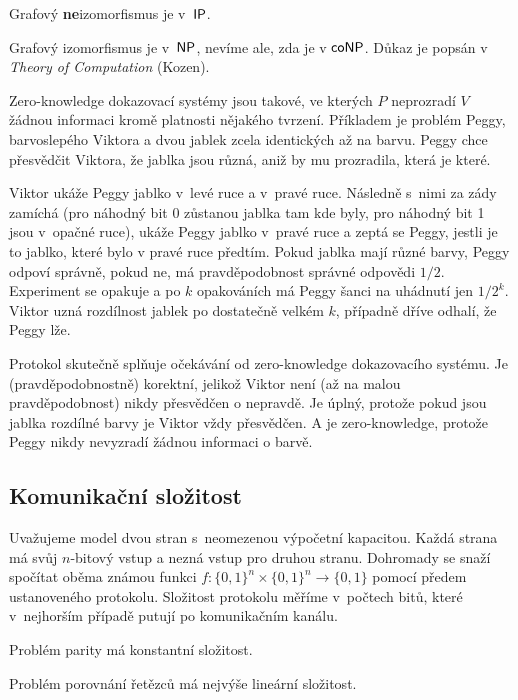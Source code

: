 \begin{theorem}
    Grafový {\bf ne}izomorfismus je v~${\mathsf{IP}}$.
\end{theorem}

Grafový izomorfismus je v~${\mathsf{NP}}$, nevíme ale, zda je v ${\mathsf{coNP}}$.
Důkaz je popsán v {\em Theory of Computation} (Kozen).


Zero-knowledge dokazovací systémy jsou takové, ve kterých $P$ neprozradí
$V$ žádnou informaci kromě platnosti nějakého tvrzení. Příkladem je
problém Peggy, barvoslepého Viktora a dvou jablek zcela identických až
na barvu. Peggy chce přesvědčit Viktora, že jablka jsou různá, aniž by
mu prozradila, která je které.

Viktor ukáže Peggy jablko v~levé ruce a v~pravé ruce. Následně s~nimi
za zády zamíchá (pro náhodný bit 0 zůstanou jablka tam kde byly, pro
náhodný bit 1 jsou v~opačné ruce), ukáže Peggy jablko v~pravé ruce a
zeptá se Peggy, jestli je to jablko, které bylo v pravé ruce předtím.
Pokud jablka mají různé barvy, Peggy odpoví správně, pokud ne, má
pravděpodobnost správné odpovědi $1/2$.
Experiment se opakuje a po $k$ opakováních má Peggy šanci na uhádnutí
jen $1/2^k$. Viktor uzná rozdílnost jablek po dostatečně velkém
$k$, případně dříve odhalí, že Peggy lže.

Protokol skutečně splňuje očekávání od zero-knowledge dokazovacího
systému. Je (pravděpodobnostně) korektní, jelikož Viktor není (až na
malou pravděpodobnost) nikdy přesvědčen o nepravdě.
Je úplný, protože pokud jsou jablka rozdílné barvy je Viktor vždy
přesvědčen. A je zero-knowledge, protože Peggy nikdy nevyzradí žádnou
informaci o barvě.

\subsection{Komunikační složitost}

Uvažujeme model dvou stran s~neomezenou výpočetní kapacitou.
Každá strana má svůj $n$-bitový vstup a nezná vstup pro druhou stranu.
Dohromady se snaží spočítat oběma známou funkci
$f : \{0,1\}^n \times \{0,1\}^n \to \{0,1\}$
pomocí předem ustanoveného protokolu. Složitost protokolu měříme v~počtech
bitů, které v~nejhorším případě putují po komunikačním kanálu.

\begin{example}
Problém parity má konstantní složitost.
\end{example}

\begin{example}
Problém porovnání řetězců má nejvýše lineární složitost.
\end{example}

